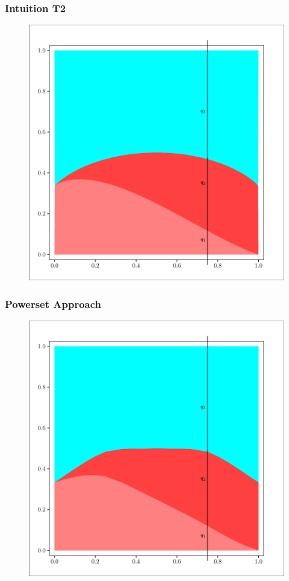 \documentclass[xcolor=dvipsnames]{beamer}
\begin{document}
\begin{frame}
  \frametitle{Intuition T2}
\begin{figure}[h]
\includegraphics[scale=.4]{../diagrams/zeroone-mxnt.pdf}
\end{figure}
\end{frame}

\begin{frame}
  \frametitle{Powerset Approach}
\begin{figure}[h]
\includegraphics[scale=.4]{../diagrams/zeroone-pwst.pdf}
\end{figure}
\end{frame}
\end{document}

